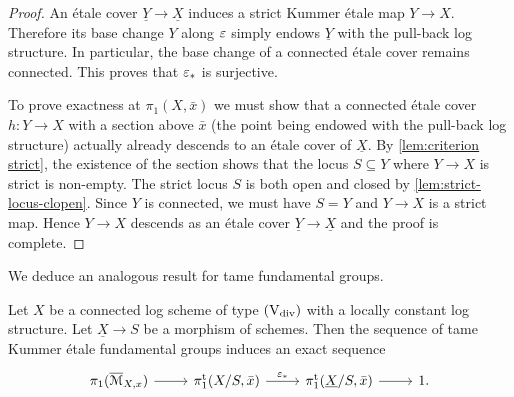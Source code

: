 \begin{proof}
An \'etale cover $\underline{Y} \to \underline{X}$ induces a strict Kummer \'etale map $Y \to X$. Therefore its base change $Y$ along $\varepsilon$ simply endows $\underline{Y}$ with the pull-back log structure. In particular, the base change of a connected \'etale cover remains connected. This proves that $\varepsilon_\ast$ is surjective. 

To prove exactness at $\pi_1(X, \bar x)$ we must show that a connected \'etale cover $h\colon  Y \to X$ with a section above $\bar x$ (the point being endowed with the pull-back log structure) actually already descends to an \'etale  cover of $\underline{X}$. By \cref{lem:criterion strict}, the existence of the section shows that the locus $S \subseteq Y$ where $Y \to X$ is strict is non-empty. The strict locus $S$ is both open and closed by \cref{lem:strict-locus-clopen}.
Since $Y$ is connected, we must have $S=Y$ and $Y \to X$ is a strict map. Hence $Y \to X$ descends as an \'etale cover $\underline{Y} \to \underline{X}$ and the proof is complete.
\end{proof}

We deduce an analogous result for tame fundamental groups.

\begin{cor} \label{cor:torus-fibration-tame}
    Let $X$ be a connected log scheme of type $(\mathrm{V}_{\rm div})$ with a locally constant log structure. 
    Let $\underline{X}\to S$ be a morphism of schemes. Then the sequence of tame Kummer \'etale fundamental groups induces an exact sequence
    \[
        \begin{tikzcd}
            \pi_1(\ov \cM_{X,x}) \ar[r] & \pitame(X/S,\bar x) \ar[r,"\ep_\ast"] & \pitame(\underline{X}/S,\bar x) \ar[r] & 1.
        \end{tikzcd}
    \]
\end{cor}

